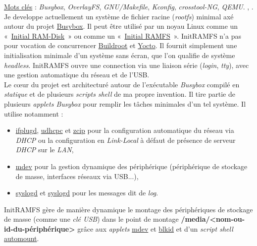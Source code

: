 \documentclass[a4paper]{article}
\begin{document}
\underline{Mots clés} : \textit{Busybox}, \textit{OverlayFS}, \textit{GNU/Makefile}, \textit{Kconfig}, \textit{crosstool-NG}, \textit{QEMU}. , \textit{}.\\

Je developpe actuellement un système de fichier racine (\textit{rootfs}) minimal axé autour du projet \href{http://www.busybox.net/}{Busybox}. Il peut être utilisé par un noyau Linux comme un «~\href{https://www.kernel.org/doc/Documentation/initrd.txt}{Initial RAM-Disk}~» ou comme un «~\href{https://www.kernel.org/doc/Documentation/filesystems/ramfs-rootfs-initramfs.txt}{Initial RAMFS}~». InitRAMFS n'a pas pour vocation de concurrencer \href{http://buildroot.org/}{Buildroot} et \href{https://www.yoctoproject.org/}{Yocto}. Il fournit simplement une initialisation minimale d'un système sans écran, que l'on qualifie de système \textit{headless}. InitRAMFS ouvre une connection via une liaison série (\textit{login}, \textit{tty}), avec une gestion automatique du réseau et de l'USB.\\

Le c\oe{}ur du projet est architecturé autour de l'exécutable \textit{Busybox} compilé en \textit{statique} et de plusieurs \textit{scripts shell} de ma propre invention. Il tire partie de plusieurs \textit{applets Busybox} pour remplir les tâches minimales d'un tel système. Il utilise notamment :
\begin{itemize}
\item \href{http://www.busybox.net/downloads/BusyBox.html#ifplugd}{ifplugd}, \href{http://www.busybox.net/downloads/BusyBox.html#udhcpc}{udhcpc} et \href{http://www.busybox.net/downloads/BusyBox.html#zcip}{zcip} pour la configuration automatique du réseau via \textit{DHCP} ou la configuration en \textit{Link-Local} à défaut de présence de serveur \textit{DHCP} sur le \textit{LAN},
\item \href{http://www.busybox.net/downloads/BusyBox.html#mdev}{mdev} pour la gestion dynamique des périphérique (périphérique de stockage de masse, interfaces réseaux via USB...),
\item \href{http://www.busybox.net/downloads/BusyBox.html#syslogd}{syslogd} et \href{http://www.busybox.net/downloads/BusyBox.html#klogd}{syslogd} pour les messages dit de \textit{log}.
\end{itemize}

InitRAMFS gère de manière dynamique le montage des périphériques de stockage de masse (comme une \textit{clé USB}) dans le point de montage \textbf{/media/<nom-ou-id-du-périphérique>} grâce aux \textit{applets} \href{http://www.busybox.net/downloads/BusyBox.html#mdev}{mdev} et \href{http://www.busybox.net/downloads/BusyBox.html#blkid}{blkid} et d'un \textit{script shell} \href{https://github.com/gazoo74/initramfs/blob/old-fixes-and-dev-need-study/packages-initramfs/mdev/usr/sbin/automount}{automount}.\\
\end{document}

